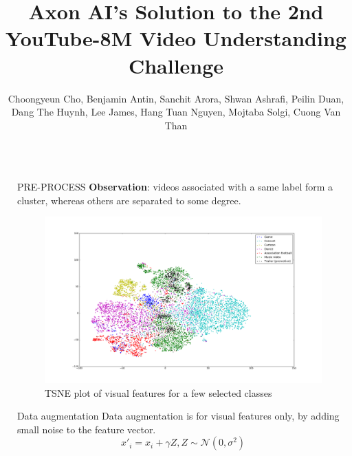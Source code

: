 \documentclass[final]{beamer}
\title{Axon AI's Solution to the 2nd YouTube-8M Video Understanding Challenge}
\author{Choongyeun Cho, Benjamin Antin, Sanchit Arora, Shwan Ashrafi, Peilin Duan, Dang The Huynh, Lee James, Hang Tuan Nguyen, Mojtaba Solgi, Cuong Van Than}
\institute{Axon AI}
\newlength{\sepwidth}
\newlength{\colwidth}
\newcommand{\separatorcolumn}{\begin{column}{\sepwidth}\end{column}}
\begin{document}
\begin{frame}[t]
\begin{columns}[t]
\separatorcolumn

\begin{column}{\colwidth}

  \begin{block}{PRE-PROCESS}
    \textbf{Observation}: videos associated with a same label form a cluster, whereas others are separated to some degree.
	\begin{figure}
    	\centering
    	\includegraphics[width=1.0\linewidth]{../figures/tsne-vfeat-large2.png}
		\caption{TSNE plot of visual features for a few selected classes}	
    \end{figure}
  \end{block}
  
  \begin{alertblock}{Data augmentation}
    Data augmentation is for visual features only, by adding small noise to the feature vector.
	\begin{equation}
		x'_i = x_i + \gamma Z, Z \sim \mathcal{N}(0, \sigma^2)
	\end{equation}
    

\end{alertblock}
\end{column}
\end{columns}
\end{frame}
\end{document}
